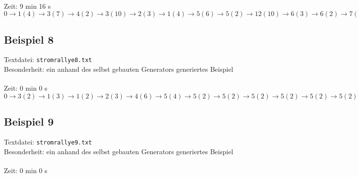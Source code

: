 \documentclass[a4paper,10pt,ngerman]{scrartcl}
\begin{document}
\noindent
{}\\

\noindent
Zeit: 9 min 16 s\\

\noindent
$0 \rightarrow 1(4) \rightarrow 3(7) \rightarrow 4(2) \rightarrow 3(10) \rightarrow 2(3) \rightarrow 1(4) \rightarrow 5(6) \rightarrow 5(2) 
\rightarrow 12(10) \rightarrow 6(3) \rightarrow 6(2) \rightarrow 7(2) \rightarrow 8(2) \rightarrow 9(2) \rightarrow 10(2) \rightarrow 11(2) 
\rightarrow 13(1) \rightarrow 14(1) \rightarrow 15(1) \rightarrow 16(1) \rightarrow 17(1) \rightarrow 18(1) \rightarrow 19(1) \rightarrow 20(3) 
\rightarrow 21(1) \rightarrow 22(1) \rightarrow 23(1) \rightarrow 24(1) \rightarrow 25(1) \rightarrow 28(1) \rightarrow 27(1) \rightarrow 26(1) 
\rightarrow 27(1) \rightarrow 30(1) \rightarrow 31(1) \rightarrow 30(1) \rightarrow 33(1) \rightarrow 34(1) \rightarrow 35(1) \rightarrow 32(1) 
\rightarrow 29(1) \rightarrow -1(1)$

\subsection{Beispiel 8}\label{example:8}
Textdatei: \texttt{stromrallye8.txt}\\
Besonderheit: ein anhand des selbst gebauten Generators generiertes Beispiel\\

\noindent
{}\\

\noindent
Zeit: 0 min 0 s\\

\noindent
$0 \rightarrow3(2) \rightarrow 1(3) \rightarrow 1(2) \rightarrow 2(3) \rightarrow 4(6) \rightarrow 5(4) \rightarrow 5(2) \rightarrow 5(2)
\rightarrow 5(2) \rightarrow 5(2) \rightarrow 5(2) \rightarrow 5(2) \rightarrow 5(2) \rightarrow 5(2)$

\subsection{Beispiel 9}\label{example:9}
Textdatei: \texttt{stromrallye9.txt}\\
Besonderheit: ein anhand des selbst gebauten Generators generiertes Beispiel\\

\noindent
{}\\

\noindent
Zeit: 0 min 0 s\\
\end{document}
